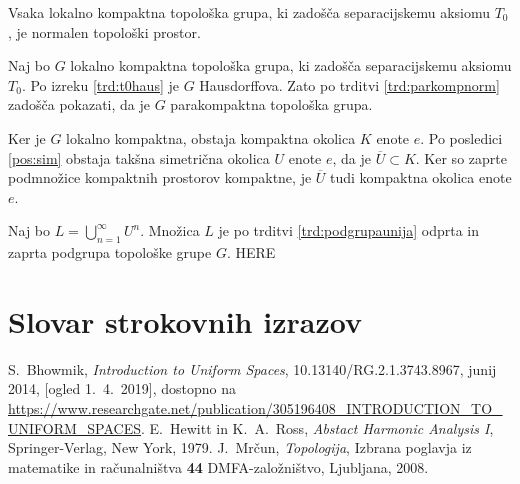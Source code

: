 \documentclass[mat1]{fmfdelo}
\newcommand{\closure}[1]{\overline{#1}}
\begin{document}
\begin{izrek}\label{izr:t4}
	Vsaka lokalno kompaktna topološka grupa, ki zadošča separacijskemu aksiomu $T_0$, je normalen topološki prostor.
\end{izrek}

\begin{dokaz}
Naj bo $G$ lokalno kompaktna topološka grupa, ki zadošča separacijskemu aksiomu $T_0$. Po izreku \ref{trd:t0haus} je $G$ Hausdorffova. Zato po trditvi \ref{trd:parkompnorm} zadošča pokazati, da je $G$ parakompaktna topološka grupa.

Ker je $G$ lokalno kompaktna, obstaja kompaktna okolica $K$ enote $e$. Po posledici \ref{pos:sim} obstaja takšna simetrična okolica $U$ enote $e$, da je $\closure{U} \subset K$. Ker so zaprte podmnožice kompaktnih prostorov kompaktne, je $\closure{U}$ tudi kompaktna okolica enote $e$.

Naj bo $L = \bigcup_{n=1}^\infty U^n$. Množica $L$ je po trditvi \ref{trd:podgrupaunija} odprta in zaprta podgrupa topološke grupe $G$. HERE
\end{dokaz}

\section*{Slovar strokovnih izrazov}

\geslo{}{}
\geslo{}{}

\begin{thebibliography}{99}

S.~Bhowmik, \emph{Introduction to Uniform Spaces}, 10.13140/RG.2.1.3743.8967, junij 2014, [ogled 1.~4.~2019], dostopno na \url{https://www.researchgate.net/publication/305196408_INTRODUCTION_TO_UNIFORM_SPACES}.
E.~Hewitt in K.~A.~Ross, \emph{Abstact Harmonic Analysis I}, Springer-Verlag, New York, 1979.
J.~Mrčun, \emph{Topologija}, Izbrana poglavja iz matematike in računalništva \textbf{44} DMFA-založništvo, Ljubljana, 2008.

\end{thebibliography}
\end{document}
